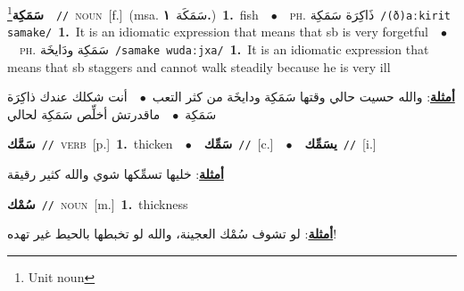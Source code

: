 \documentclass[10pt,a4paper,twoside]{article} %
\begin{document}
\begin{multicols}{2}
{\setlength\topsep{0pt}\textbf{\foreignlanguage{arabic}{سَمَكِة}}\footnote{Unit noun}\ \ {\color{gray}\texttt{//}\color{black}}\ \textsc{noun}\ [f.]\ \color{gray}(msa. \foreignlanguage{arabic}{سَمَكَة}~\foreignlanguage{arabic}{\textbf{١.}})\color{black}\ \textbf{1.}~fish\ \ $\bullet$\ \ \textsc{ph.} \color{gray} \foreignlanguage{arabic}{ذَاكِرَة سَمَكِة}\color{black}\ {\color{gray}\texttt{/{\sffamily (ð)aːkirit samake}/}\color{black}}\ \textbf{1.}~It is an idiomatic expression that means that sb is very forgetful\ \ $\bullet$\ \ \textsc{ph.} \color{gray} \foreignlanguage{arabic}{سَمَكِة ودَايخَة}\color{black}\ {\color{gray}\texttt{/{\sffamily samake wudaːjxa}/}\color{black}}\ \textbf{1.}~It is an idiomatic expression that means that sb staggers and cannot walk steadily because he is very ill\  \begin{flushright}\color{gray}\foreignlanguage{arabic}{\textbf{\underline{\foreignlanguage{arabic}{أمثلة}}}: والله حسيت حالي وقتها سَمَكِة ودايخَة من كثر التعب\ $\bullet$\ \  أنت شكلك عندك ذاكِرَة سَمَكِة\ $\bullet$\ \  ماقدرتش أخلِّص سَمَكِة لحالي}\end{flushright}\color{black}} \vspace{2mm}

{\setlength\topsep{0pt}\textbf{\foreignlanguage{arabic}{سَمَّك}}\ {\color{gray}\texttt{//}\color{black}}\ \textsc{verb}\ [p.]\ \textbf{1.}~thicken\ \ $\bullet$\ \ \setlength\topsep{0pt}\textbf{\foreignlanguage{arabic}{سَمِّك}}\ {\color{gray}\texttt{//}\color{black}}\ [c.]\ \ $\bullet$\ \ \setlength\topsep{0pt}\textbf{\foreignlanguage{arabic}{يسَمِّك}}\ {\color{gray}\texttt{//}\color{black}}\ [i.]\  \begin{flushright}\color{gray}\foreignlanguage{arabic}{\textbf{\underline{\foreignlanguage{arabic}{أمثلة}}}: خليها تسمِّكها شوي والله كثير رقيقة}\end{flushright}\color{black}} \vspace{2mm}

{\setlength\topsep{0pt}\textbf{\foreignlanguage{arabic}{سُمْك}}\ {\color{gray}\texttt{//}\color{black}}\ \textsc{noun}\ [m.]\ \textbf{1.}~thickness\  \begin{flushright}\color{gray}\foreignlanguage{arabic}{\textbf{\underline{\foreignlanguage{arabic}{أمثلة}}}: لو تشوف سُمْك العجينة، والله لو تخبطها بالحيط غير تهده!}\end{flushright}\color{black}} \vspace{2mm}


\end{multicols}
\end{document}
